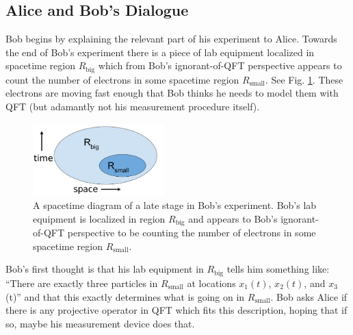 \documentclass[12pt,prd,superscriptaddress,floatfix,amsmath,amssymb,amsfonts,nofootinbib]{revtex4-2}
\begin{document}



\subsection{Alice and Bob's Dialogue}
Bob begins by explaining the relevant part of his experiment to Alice. Towards the end of Bob's experiment there is a piece of lab equipment localized in spacetime region $R_\text{big}$ which from Bob's ignorant-of-QFT perspective appears to count the number of electrons in some spacetime region $R_\text{small}$. See Fig. \ref{FigBigSmall}. These electrons are moving fast enough that Bob thinks he needs to model them with QFT (but adamantly not his measurement procedure itself).

\begin{figure}
\includegraphics[width=0.45\textwidth]{Figures/FigBigSmall.pdf}
\caption{A spacetime diagram of a late stage in Bob's experiment. Bob's lab equipment is localized in region $R_\text{big}$ and appears to Bob's ignorant-of-QFT perspective to be counting the number of electrons in some spacetime region $R_\text{small}$. }\label{FigBigSmall}
\end{figure}

Bob's first thought is that his lab equipment in $R_\text{big}$ tells him something like: ``There are exactly three particles in $R_\text{small}$ at locations $x_1(t)$, $x_2(t)$, and $x_3$(t)'' and that this exactly determines what is going on in $R_\text{small}$. Bob asks Alice if there is any projective operator in QFT which fits this description, hoping that if so, maybe his measurement device does that.
 
\end{document}
